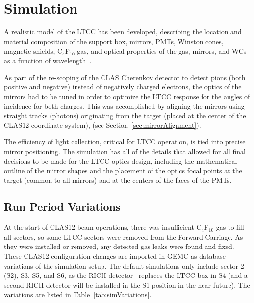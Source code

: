 \section{Simulation}

A realistic model of the LTCC has been developed, describing the location and material composition of the support
box, mirrors, PMTs, Winston cones, magnetic shields, C$_4$F$_{10}$ gas, and optical properties of the gas, mirrors,
and WCs as a function of wavelength~\cite{sim-nim}.

As part of the re-scoping of the CLAS Cherenkov detector to detect pions (both positive and negative) instead of
negatively charged electrons, the optics of the mirrors had to be tuned in order to optimize the LTCC response
for the angles of incidence for both charges. This was accomplished by aligning the mirrors using straight tracks
(photons) originating from the target (placed at the center of the CLAS12 coordinate system), (see
Section~\ref{sec:mirrorAlignment}).

The efficiency of light collection, critical for LTCC operation, is tied into precise mirror positioning. The simulation
has all of the details that allowed for all final decisions to be made for the LTCC optics design, including the
mathematical outline of the mirror shapes and the placement of the optics focal points at the target (common to all
mirrors) and at the centers of the faces of the PMTs.

\subsection{Run Period Variations}

At the start of CLAS12 beam operations, there was insufficient C$_4$F$_{10}$ gas to fill all sectors, so some LTCC
sectors were removed from the Forward Carriage. As they were installed or removed, any detected gas leaks were
found and fixed. These CLAS12 configuration changes are imported in GEMC as database variations of the simulation
setup. The default simulations only include sector 2 (S2), S3, S5, and S6, as the RICH detector~\cite{rich-nim}
replaces the LTCC box in S4 (and a second RICH detector will be installed in the S1 position in the near future). The
variations are listed in Table~\ref{tab:simVariations}.

